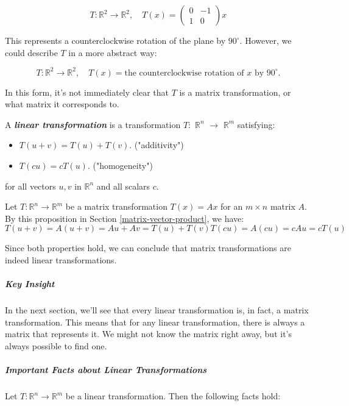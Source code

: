 \documentclass[a4paper,12pt]{article}
\begin{document}
\[
T: \mathbb{R}^2 \to \mathbb{R}^2, \quad T(x) = \begin{pmatrix} 0 & -1 \\ 1 & 0 \end{pmatrix} x
\]

This represents a counterclockwise rotation of the plane by \(90^\circ\). However, we could describe \(T\) in a more abstract way:

\[
T: \mathbb{R}^2 \to \mathbb{R}^2, \quad T(x) = \text{the counterclockwise rotation of } x \text{ by } 90^\circ.
\]

In this form, it's not immediately clear that \(T\) is a matrix transformation, or what matrix it corresponds to.

\begin{tcolorbox}[title=Definition,colframe=blue!70!black, colback=blue!5!white]
A \textbf{\textit{linear transformation}} is a transformation $T:$ \(\mathbb{R}^n\) $\rightarrow$ \(\mathbb{R}^m\) satisfying:
\begin{itemize}
    \item $T(u+v) = T(u) + T(v)$. \quad ("additivity")
    \item $T(cu) = cT(u)$. \quad ("homogeneity")
\end{itemize}
for all vectors $u,v$ in \(\mathbb{R}^n\) and all scalars $c$.
\end{tcolorbox}

Let $T:\mathbb{R}^n \rightarrow \mathbb{R}^m$ be a matrix transformation $T(x)=Ax$ for an $m \times n$ matrix $A$. By this proposition in Section \ref{matrix-vector-product}, we have:
\[
T(u+v)=A(u+v)=Au+Av=T(u)+T(v)
T(cu)=A(cu)=cAu=cT(u)
\]

Since both properties hold, we can conclude that matrix transformations are indeed linear transformations.

\subparagraph{Key Insight}

In the next section, we’ll see that every linear transformation is, in fact, a matrix transformation. This means that for any linear transformation, there is always a matrix that represents it. We might not know the matrix right away, but it’s always possible to find one.

\subparagraph{Important Facts about Linear Transformations}

Let $T: \mathbb{R}^n \to \mathbb{R}^m$ be a linear transformation. Then the following facts hold:
\end{document}
